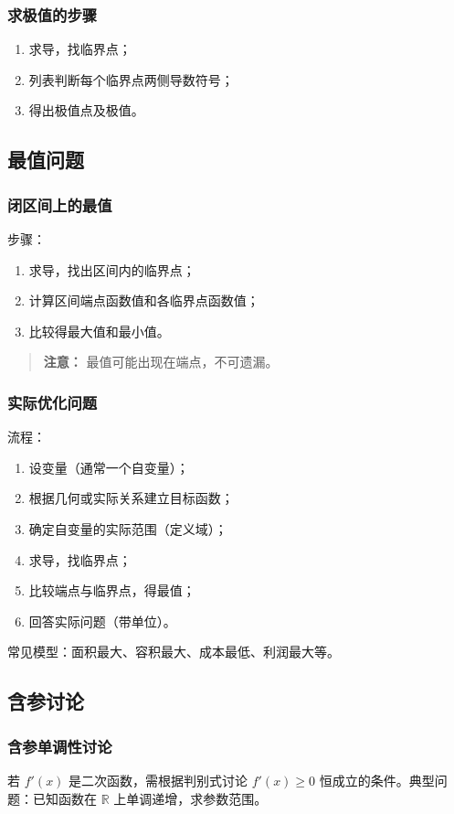 \documentclass[10pt]{article}
\begin{document}
\subsubsection{求极值的步骤}
\begin{enumerate}
    \item 求导，找临界点；
    \item 列表判断每个临界点两侧导数符号；
    \item 得出极值点及极值。
\end{enumerate}

\subsection{最值问题}
\subsubsection{闭区间上的最值}
步骤：
\begin{enumerate}
    \item 求导，找出区间内的临界点；
    \item 计算区间端点函数值和各临界点函数值；
    \item 比较得最大值和最小值。
\end{enumerate}
\begin{quote}
    \textbf{注意：} 最值可能出现在端点，不可遗漏。
\end{quote}

\subsubsection{实际优化问题}
流程：
\begin{enumerate}
    \item 设变量（通常一个自变量）；
    \item 根据几何或实际关系建立目标函数；
    \item 确定自变量的实际范围（定义域）；
    \item 求导，找临界点；
    \item 比较端点与临界点，得最值；
    \item 回答实际问题（带单位）。
\end{enumerate}
常见模型：面积最大、容积最大、成本最低、利润最大等。

\subsection{含参讨论}
\subsubsection{含参单调性讨论}
若 $f'(x)$ 是二次函数，需根据判别式讨论 $f'(x)\ge 0$ 恒成立的条件。典型问题：已知函数在 $\mathbb{R}$ 上单调递增，求参数范围。
\end{document}
